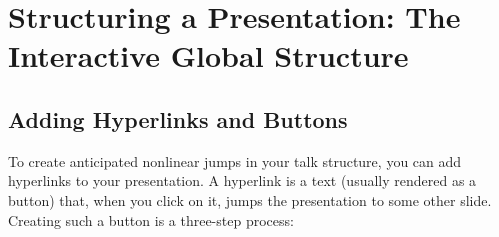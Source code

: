 %
%
%

\section{Structuring a Presentation: The Interactive Global Structure}
\label{section-nonlinear}

\subsection{Adding Hyperlinks and Buttons}

To create anticipated nonlinear jumps in your talk structure, you can add hyperlinks to your presentation. A hyperlink is a text (usually rendered as a button) that, when you click on it, jumps the presentation to some other slide. Creating such a button is a three-step process:

